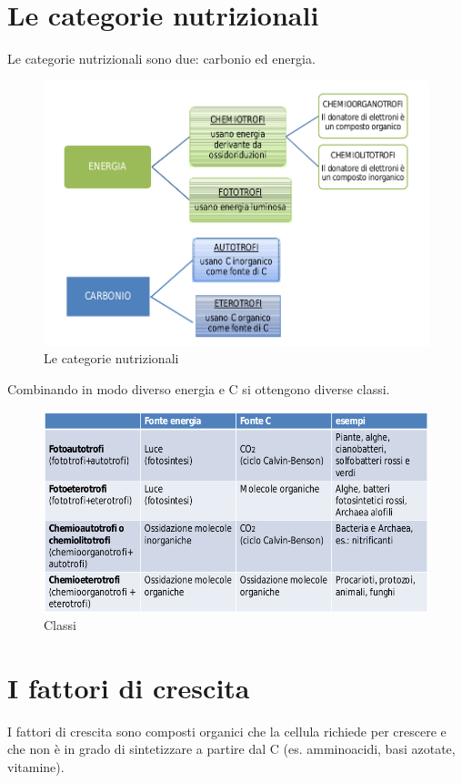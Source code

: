 \documentclass[11pt]{book}
\begin{document}
\clearpage
\section{Le categorie nutrizionali}
Le categorie nutrizionali sono due: carbonio ed energia.

\begin{figure}[htp]
\centering
\includegraphics[scale=0.4]{img/Categorie nutrizionali.png}
\caption{Le categorie nutrizionali}
\label{}
\end{figure}

Combinando in modo diverso energia e C si ottengono diverse classi.

\begin{figure}[htp]
\centering
\includegraphics[scale=0.4]{img/Combinazioni energia e carbonio.png}
\caption{Classi}
\label{}
\end{figure}

\section{I fattori di crescita}
I fattori di crescita sono composti organici che la cellula richiede per crescere e che non è in grado di sintetizzare a partire dal C (es. amminoacidi, basi azotate, vitamine).
\end{document}
